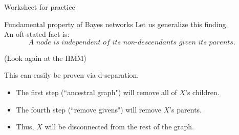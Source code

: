 \documentclass[10pt]{beamer}
\begin{document}
 
\begin{frame}{Worksheet for practice}
\end{frame}


\begin{frame}{Fundamental property of Bayes networks}
Let us generalize this finding. \\

An oft-stated fact is:
\[ \textit{A node is independent of its non-descendants given its parents. } \]

\pause \tiny (Look again at the HMM)  \normalsize \pause 

This can easily be proven via d-separation.  
\begin{itemize}
\item The first step (``ancestral graph") will remove all of $X$'s children.
\item The fourth step (``remove givens") will remove $X$'s parents. 
\item Thus, $X$ will be disconnected from the rest of the graph.
\end{itemize}
\end{frame}
\end{document}
